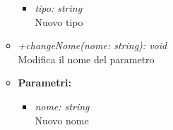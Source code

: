 \begin{itemize}
\begin{itemize}
            				\begin{itemize}
            					\item \emph{tipo: string}\\
            					Nuovo tipo
            				\end{itemize}
            			\item \emph{+changeNome(nome: string): void}\\
            			Modifica il nome del parametro
            			\item \textbf{Parametri:}\\
            				\begin{itemize}
            					\item \emph{nome: string}\\
            					Nuovo nome
            				\end{itemize}            			
          			\end{itemize}
          		\end{itemize}
